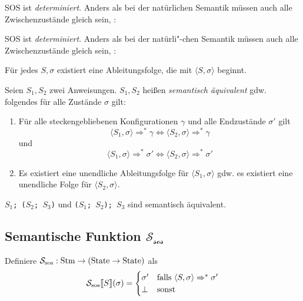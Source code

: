 \begin{lemma}[Determiniertheit]
    SOS ist \emph{determiniert}. Anders als bei der natürlichen Semantik müssen auch alle Zwischenzustände gleich sein, \dh{}:
\par\medskip
\begin{lemma}[Determiniertheit]
    SOS ist \emph{determiniert}. Anders als bei der natürli"-chen Semantik müssen auch alle Zwischenzustände gleich sein, \dh{}:

        Für jedes $S, \sigma$ existiert eine Ableitungsfolge, die mit $\langle S, \sigma \rangle$ beginnt.
\end{lemma}


\par\medskip
\begin{definition}
    Seien $S_1, S_2$ zwei Anweisungen. $S_1, S_2$ heißen \emph{semantisch äquivalent} gdw. folgendes für alle Zustände $\sigma$ gilt:

    \begin{enumerate}
        \item Für alle steckengebliebenen Konfigurationen $\gamma$ und alle Endzustände $\sigma'$ gilt
            \[
                \langle S_1, \sigma \rangle \Rightarrow^* \gamma \Leftrightarrow \langle S_2, \sigma \rangle \Rightarrow^* \gamma
            \]
            und
            \[
                \langle S_1, \sigma \rangle \Rightarrow^* \sigma' \Leftrightarrow \langle S_2, \sigma \rangle \Rightarrow^* \sigma'
            \]
        \item Es existiert eine unendliche Ableitungsfolge für $\langle S_1, \sigma \rangle$ gdw. es existiert eine unendliche Folge für $\langle S_2, \sigma \rangle$.
    \end{enumerate}
\end{definition}

\par\medskip
\begin{example}
    \texttt{$S_1$; ($S_2$; $S_3$)} und \texttt{($S_1$; $S_2$); $S_3$} sind semantisch äquivalent.
\end{example}



\subsection{Semantische Funktion $\mathcal{S_{\text{sos}}}$}

\begin{definition}
    Definiere $\mathcal{S_{\text{sos}}}: \operatorname{Stm} \to (\operatorname{State} \to \operatorname{State})$ als
    \[
        \mathcal{S_{\text{sos}}}\mathrm{[}\kern-.14em\mathrm{[} S \mathrm{]}\kern-.14em\mathrm{]}(\sigma) = \begin{cases}
            \sigma' & \text{falls } \langle S, \sigma \rangle \Rightarrow^* \sigma' \\
            \bot & \text{sonst}
        \end{cases}
    \]


\end{definition}
\end{lemma}
